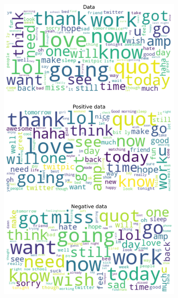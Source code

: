 \documentclass{article}
\begin{document}
\begin{itemize}
\begin{figure}[H]
\centering
\captionsetup{justification=centering}
\begin{subfigure}[b]{0.24\textwidth}
\centering
\includegraphics[width=\textwidth]{chapter-06/section-01-01/09/visualization/1/wordcloud.png}
\end{subfigure}
\begin{subfigure}[b]{0.24\textwidth}
\centering

\end{subfigure}
\end{figure}
\end{itemize}
\end{document}

